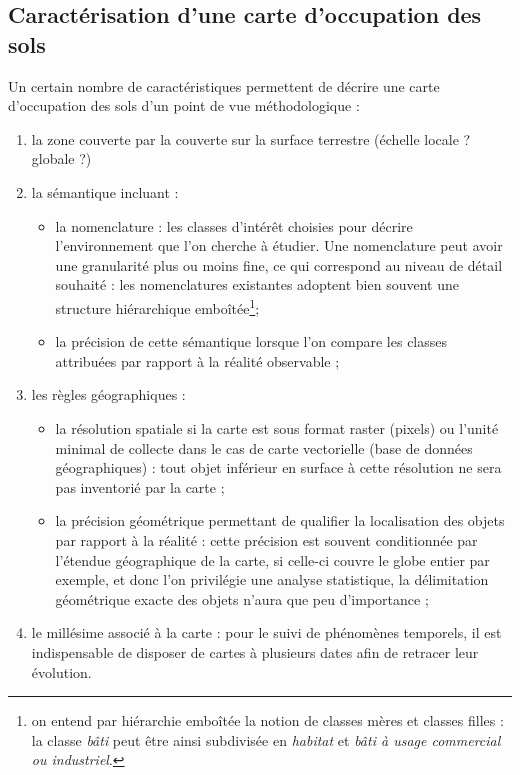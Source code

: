 \subsection{Caractérisation d'une carte d'occupation des sols}
\label{ssec:carac_ocs}
Un certain nombre de caractéristiques permettent de décrire une carte d'occupation des sols d'un point de vue méthodologique :
\begin{enumerate}
    \item la zone couverte par la couverte sur la surface terrestre (échelle locale ? globale ?)
    \item la sémantique incluant :
    \begin{itemize}[label=\textbullet]
        \item la nomenclature : les classes d'intérêt choisies pour décrire l'environnement que l'on cherche à étudier. Une nomenclature peut avoir une granularité plus ou moins fine, ce qui correspond au niveau de détail souhaité : les nomenclatures existantes adoptent bien souvent une structure hiérarchique emboîtée\footnote{on entend par hiérarchie emboîtée la notion de classes \og mères\fg{} et classes \og filles \fg{} : la classe \textit{bâti} peut être ainsi subdivisée en \textit{habitat} et \textit{bâti à usage commercial ou industriel}.};
        \item la précision de cette sémantique lorsque l'on compare les classes attribuées par rapport à la réalité observable ;
    \end{itemize}
    \item les règles géographiques :
    \begin{itemize}[label=\textbullet]
        \item la résolution spatiale si la carte est sous format raster (pixels) ou l'unité minimal de collecte dans le cas de carte vectorielle (base de données géographiques) : tout objet inférieur en surface à cette résolution ne sera pas inventorié par la carte ;
        \item la précision géométrique permettant de qualifier la localisation des objets par rapport à la réalité : cette précision est souvent conditionnée par l'étendue géographique de la carte, si celle-ci couvre le globe entier par exemple, et donc l'on privilégie une analyse statistique, la délimitation géométrique exacte des objets n'aura que peu d'importance ;
    \end{itemize}
    \item le millésime associé à la carte : pour le suivi de phénomènes temporels, il est indispensable de disposer de cartes à plusieurs dates afin de retracer leur évolution. 
\end{enumerate}

